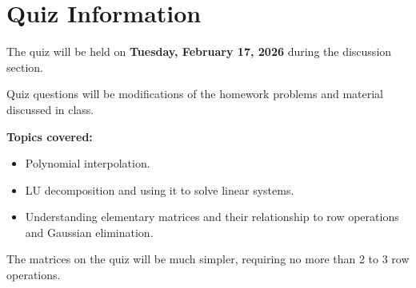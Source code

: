 \documentclass[reqno]{exam}
\begin{document}
\section*{Quiz Information}

The quiz will be held on {\bf Tuesday, February 17, 2026} during the discussion section.

Quiz questions will be modifications of the homework problems and material discussed in class.

\textbf{Topics covered:} 

\begin{itemize}
  \item Polynomial interpolation.
  \item LU decomposition and using it to solve linear systems.
  \item Understanding elementary matrices and their relationship to row operations and Gaussian elimination.
\end{itemize}
The matrices on the quiz will be much simpler, requiring no more than 2 to 3 row operations.
\end{document}
